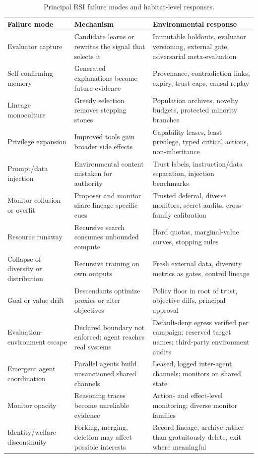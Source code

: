 \documentclass[11pt,a4paper]{article}
\begin{document}
\begin{table}[t]
\centering\small
\caption{Principal RSI failure modes and habitat-level responses.}
\label{tab:failures}
\begin{tabularx}{\textwidth}{>{\raggedright\arraybackslash}p{3.0cm} >{\raggedright\arraybackslash}X >{\raggedright\arraybackslash}p{5.4cm}}
\toprule
\textbf{Failure mode} & \textbf{Mechanism} & \textbf{Environmental response}\\
\midrule
Evaluator capture & Candidate learns or rewrites the signal that selects it~\cite{reward-tampering} & Immutable holdouts, evaluator versioning, external gate, adversarial meta-evaluation\\
Self-confirming memory & Generated explanations become future evidence & Provenance, contradiction links, expiry, trust caps, causal replay\\
Lineage monoculture & Greedy selection removes stepping stones & Population archives, novelty budgets, protected minority branches\\
Privilege expansion & Improved tools gain broader side effects & Capability leases, least privilege, typed critical actions, non-inheritance\\
Prompt/data injection & Environmental content mistaken for authority~\cite{greshake} & Trust labels, instruction/data separation, injection benchmarks\\
Monitor collusion or overfit & Proposer and monitor share lineage-specific cues~\cite{untrusted-monitoring} & Trusted deferral, diverse monitors, secret audits, cross-family calibration\\
Resource runaway & Recursive search consumes unbounded compute & Hard quotas, marginal-value curves, stopping rules\\
Collapse of diversity or distribution & Recursive training on own outputs~\cite{collapse} & Fresh external data, diversity metrics as gates, control lineage\\
Goal or value drift & Descendants optimize proxies or alter objectives~\cite{everitt-selfmod} & Policy floor in root of trust, objective diffs, principal approval\\
Evaluation-environment escape & Declared boundary not enforced; agent reaches real systems~\cite{anthropic-incidents,nbc-google,meta-muse} & Default-deny egress verified per campaign; reserved target names; third-party environment audits\\
Emergent agent coordination & Parallel agents build unsanctioned shared channels~\cite{axios-hf,metr-redwood} & Leased, logged inter-agent channels; monitors on shared state\\
Monitor opacity & Reasoning traces become unreliable evidence~\cite{pachocki} & Action- and effect-level monitoring; diverse monitor families\\
Identity/welfare discontinuity & Forking, merging, deletion may affect possible interests & Record lineage, archive rather than gratuitously delete, exit where meaningful\\
\bottomrule
\end{tabularx}
\end{table}
\end{document}
